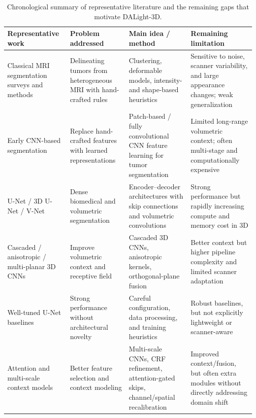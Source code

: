 \documentclass[conference]{IEEEtran}
\begin{document}
\begin{table}[t]
\centering
\caption{Chronological summary of representative literature and the remaining gaps that motivate DALight-3D.}
\label{tab:lit_summary}
\begin{tabular}{p{2.9cm} p{3.2cm} p{4.9cm} p{4.8cm}}
\toprule
\textbf{Representative work} & \textbf{Problem addressed} & \textbf{Main idea / method} & \textbf{Remaining limitation} \\
\midrule
Classical MRI segmentation surveys and methods~\cite{gordillo2013survey} & Delineating tumors from heterogeneous MRI with hand-crafted rules & Clustering, deformable models, intensity- and shape-based heuristics & Sensitive to noise, scanner variability, and large appearance changes; weak generalization \\

Early CNN-based segmentation~\cite{havaei2017brainseg} & Replace hand-crafted features with learned representations & Patch-based / fully convolutional CNN feature learning for tumor segmentation & Limited long-range volumetric context; often multi-stage and computationally expensive \\

U-Net / 3D U-Net / V-Net~\cite{ronneberger2015unet,cicek20163dunet,milletari2016vnet} & Dense biomedical and volumetric segmentation & Encoder--decoder architectures with skip connections and volumetric convolutions & Strong performance but rapidly increasing compute and memory cost in 3D \\

Cascaded / anisotropic / multi-planar 3D CNNs~\cite{wang2019cascaded,andermatt2018multiplanar} & Improve volumetric context and receptive field & Cascaded 3D CNNs, anisotropic kernels, orthogonal-plane fusion & Better context but higher pipeline complexity and limited scanner adaptation \\

Well-tuned U-Net baselines~\cite{isensee2018nonewnet,isensee2021nnu} & Strong performance without architectural novelty & Careful configuration, data processing, and training heuristics & Robust baselines, but not explicitly lightweight or scanner-aware \\

Attention and multi-scale context models~\cite{kamnitsas2017multiscalecrf,oktay2018attentionunet,hu2018senet,woo2018cbam} & Better feature selection and context modeling & Multi-scale CNNs, CRF refinement, attention-gated skips, channel/spatial recalibration & Improved context/fusion, but often extra modules without directly addressing domain shift \\


\end{tabular}
\end{table}
\end{document}
